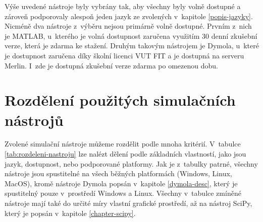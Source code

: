 Výše uvedené nástroje byly vybrány tak, aby všechny byly volně dostupné a zároveň podporovaly alespoň jeden jazyk ze zvolených v~kapitole \ref{popis-jazyky}. Nicméně dva nástroje z~výběru nejsou primárně volně dostupné. Prvním z~nich je MATLAB, u~kterého je volná dostupnost zaručena využitím 30 denní zkušební verze, která je zdarma ke stažení. Druhým takovým nástrojem je Dymola, u~které je dostupnost zaručena díky školní licenci VUT FIT a je dostupná na serveru Merlin. I~zde je dostupná zkušební verze zdarma po omezenou dobu.

\section{Rozdělení použitých simulačních nástrojů}
\label{rozdeleni-nastroju}

Zvolené simulační nástroje můžeme rozdělit podle mnoha kritérií. V~tabulce \ref{tab:rozdeleni-nastroju} lze nalézt dělení podle základních vlastností, jako jsou jazyk, dostupnost, nebo podporované platformy. Jak je z~tabulky patrné, všechny nástroje jsou spustitelné na všech běžných platformách (Windows, Linux, MacOS), kromě nástroje Dymola popsán v~kapitole \ref{dymola-desc}, který je spustitelný pouze v~prostředí Windows a Linux. Všechny v~tabulce zmíněné nástroje mají také do určité míry vlastní grafické prostředí, až na nástroj SciPy, který je popsán v~kapitole \ref{chapter-scipy}. 


